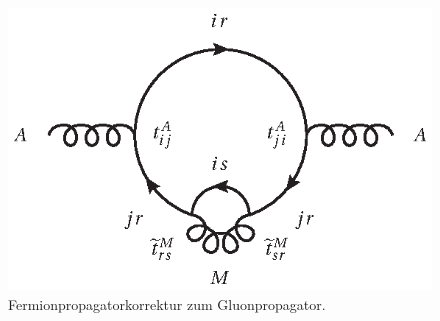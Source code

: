 \begin{figure}[h]
 \centering
 \includegraphics{abschnitte/n-schleifen/fig/QCDxdQCD2.eps}
 \caption{Fermionpropagatorkorrektur zum Gluonpropagator.}\label{fig:n-schleifen:QCDxdQCD2}
\end{figure}
